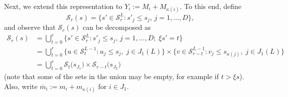 \documentclass[11pt,draft]{article}
\newcommand{\Ssp}{\mathcal{S}}
\newcommand{\mb}{\overline{m}}
\begin{document}
Next, we extend this representation to $Y_i := M_i + M_{\kappa(i)}$.
To this end, define
\[ \Ssp_r(s) = \big\{s' \in \Ssp_r^L : s'_j \leq s_j,\, j = 1,\dots,D\}, \]
and observe that $\Ssp_r(s)$ can be decomposed as
\begin{align}
\Ssp_r(s) &= \bigcup_{t = 0}^r
\big\{ s' \in \Ssp_r^L: s'_j \leq s_j,\, j = 1,\dots,D;\; \xi s' = t \big\}
\nonumber \\
&= \bigcup_{t = 0}^r
\big\{ u \in \Ssp_t^{L-1}: u_j \leq s_j, \; j \in J_1(L) \} \times
\big\{ v \in \Ssp_{r - t}^{L-1} : v_j \leq s_{\kappa(j)},\;
j \in J_1(L) \} \nonumber \\
&= \bigcup_{t = 0}^r \Ssp_{t}\big(s_{J_1}\big) \times
\Ssp_{r - t}\big(s_{J_2}\big) \label{eq:sdecomp}
\end{align}
(note that some of the sets in the union may be empty, for example if
$t > \xi s$).
Also, write $\mb_i := m_i + m_{\kappa(i)}$ for $i\in J_1$.
\end{document}
